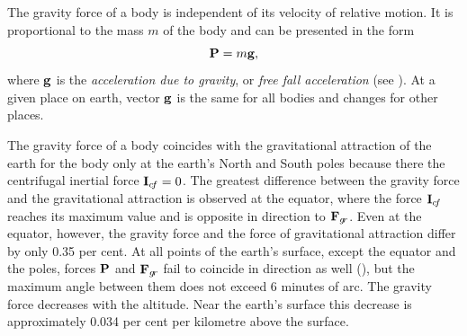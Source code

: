 \subsection{}\label{7.3.3} The gravity force of a body is independent of its velocity of relative motion. It is proportional to the mass $m$ of the body and can be presented in the form
\begin{equation*}%
\vb{P} = m\vb{g},
\end{equation*}
where $\vb{g}$ is the \emph{acceleration due to gravity}, or \emph{free fall acceleration} (see ). At a given place on earth, vector $\vb{g}$ is the same for all bodies and changes for other places.

The gravity force of a body coincides with the gravitational attraction of the earth for the body only at the earth's North and South poles because there the centrifugal inertial force $\vb{I}_{c\!f} = 0$. The greatest difference between the gravity force and the gravitational attraction is observed at the equator, where the force $\vb{I}_{c\!f}$ reaches its maximum value and is opposite in direction to $\vb{F}_{g\!r}$. Even at the equator, however, the gravity force and the force of gravitational attraction differ by only 0.35 per cent. At all points of the earth's surface, except the equator and the poles, forces $\vb{P}$ and $\vb{F}_{g\!r}$ fail to coincide in direc­tion as well (), but the maximum angle between them does not exceed 6 minutes of arc. The gravity force decreases with the altitude. Near the earth's surface this decrease is approximately 0.034 per cent per kilometre above the surface. 

